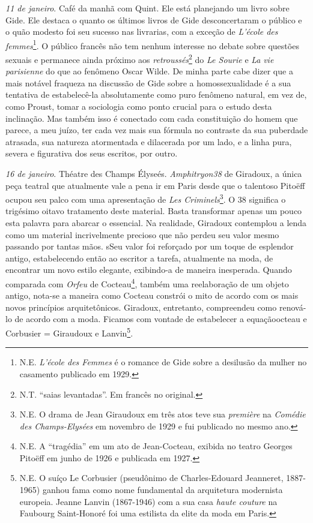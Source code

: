 \emph{11 de janeiro}. Café da manhã com Quint. Ele está planejando um
livro sobre Gide. Ele destaca o quanto os últimos livros de Gide
desconcertaram o público e o quão modesto foi seu sucesso nas livrarias,
com a exceção de \emph{L'école des femmes}\footnote{N.E. \emph{L'école
  des Femmes} é o romance de Gide sobre a desilusão da mulher no
  casamento publicado em 1929.}. O público francês não tem nenhum
interesse no debate sobre questões sexuais e permanece ainda próximo aos
\emph{retroussés}\footnote{N.T. ``saias levantadas''. Em francês no
  original.} do \emph{Le Sourie} e \emph{La} \emph{vie parisienne} do
que ao fenômeno Oscar Wilde. De minha parte cabe dizer que a mais
notável fraqueza na discussão de Gide sobre a homossexualidade é a sua
tentativa de estabelecê-la absolutamente como puro fenômeno natural, em
vez de, como Proust, tomar a sociologia como ponto crucial para o estudo
desta inclinação. Mas também isso é conectado com cada constituição do
homem que parece, a meu juízo, ter cada vez mais sua fórmula no
contraste da sua puberdade atrasada, sua natureza atormentada e
dilacerada por um lado, e a linha pura, severa e figurativa dos seus
escritos, por outro.

\emph{16 de janeiro}. Théatre des Champs Élyseés. \emph{Amphitryon38} de
Giradoux, a única peça teatral que atualmente vale a pena ir em Paris
desde que o talentoso Pitoëff ocupou seu palco com uma apresentação de
\emph{Les Criminels}\footnote{N.E. O drama de Jean Giraudoux em três
  atos teve sua \emph{première} na \emph{Comédie des Champs-Elysées} em
  novembro de 1929 e fui publicado no mesmo ano.}. O 38 significa o
trigésimo oitavo tratamento deste material. Basta transformar apenas um
pouco esta palavra para abarcar o essencial. Na realidade, Giradoux
contemplou a lenda como um material incrivelmente precioso que não
perdeu seu valor mesmo passando por tantas mãos. sSeu valor foi
reforçado por um toque de esplendor antigo, estabelecendo então ao
escritor a tarefa, atualmente na moda, de encontrar um novo estilo
elegante, exibindo-a de maneira inesperada. Quando comparada com
\emph{Orfeu} de Cocteau\footnote{N.E. A ``tragédia'' em um ato de
  Jean-Cocteau, exibida no teatro Georges Pitoëff em junho de 1926 e
  publicada em 1927.}, também uma reelaboração de um objeto antigo,
nota-se a maneira como Cocteau constrói o mito de acordo com os mais
novos princípios arquitetônicos. Giradoux, entretanto, compreendeu como
renová-lo de acordo com a moda. Ficamos com vontade de estabelecer a
equaçãoocteau e Corbusier = Giraudoux e Lanvin\footnote{N.E. O suíço Le
  Corbusier (pseudônimo de Charles-Edouard Jeanneret, 1887-1965) ganhou
  fama como nome fundamental da arquitetura modernista europeia. Jeanne
  Lanvin (1867-1946) com a sua casa \emph{haute couture} na Faubourg
  Saint-Honoré foi uma estilista da elite da moda em Paris.}.

